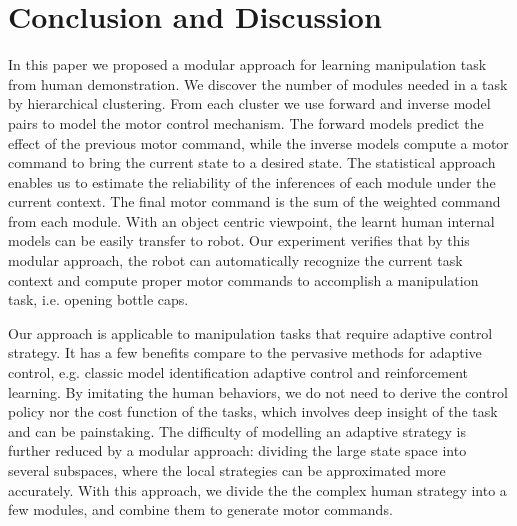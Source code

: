 \section{Conclusion and Discussion}
\label{sec:diss}
In this paper we proposed a modular approach for learning manipulation task from human demonstration. We discover the number of modules needed in a task by hierarchical clustering. From each cluster we use forward and inverse model pairs to model the motor control mechanism. The forward models predict the effect of the previous motor command, while the inverse models compute a motor command to bring the current state to a desired state. The statistical approach enables us to estimate the reliability of the inferences of each module under the current context. The final motor command is the sum of the weighted command from each module. With an object centric viewpoint, the learnt human internal models can be easily transfer to robot. Our experiment verifies that by this modular approach, the robot can automatically recognize the current task context and compute proper motor commands to accomplish a manipulation task, i.e. opening bottle caps.


Our approach is applicable to manipulation tasks that require adaptive control strategy. It has a few benefits compare to the pervasive methods for adaptive control, e.g. classic model identification adaptive control and reinforcement learning. By imitating the human behaviors, we do not need to derive the control policy nor the cost function of the tasks, which involves deep insight of the task and can be painstaking. The difficulty of modelling an adaptive strategy is further reduced by a modular approach: dividing the large state space into several subspaces, where the local strategies can be approximated more accurately. With this approach, we divide the the complex human strategy into a few modules, and combine them to generate motor commands.

